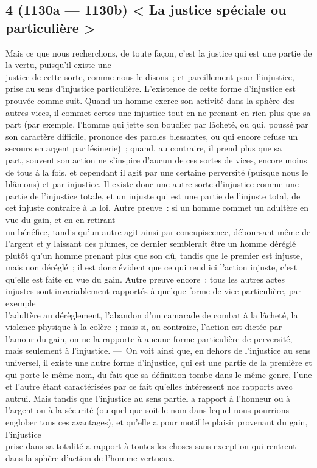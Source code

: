 \documentclass[french,twoside]{book} %
\begin{document}
\subsection[{4 (1130a — 1130b) < La justice spéciale ou particulière >}]{4 (1130a — 1130b) < La justice spéciale ou particulière >}
\noindent Mais ce que nous recherchons, de toute façon, c’est la justice qui est une partie de la vertu, puisqu’il existe une \\
justice de cette sorte, comme nous le disons ; et pareillement pour l’injustice, prise au sens d’injustice particulière. L’existence de cette forme d’injustice est prouvée comme suit. Quand un homme exerce son activité dans la sphère des autres vices, il commet certes une injustice tout en ne prenant en rien plus que sa part (par exemple, l’homme qui jette son bouclier par lâcheté, ou qui, poussé par son caractère difficile, prononce des paroles blessantes, ou qui encore refuse un secours en argent par lésinerie) ; quand, au contraire, il prend plus que sa \\
part, souvent son action ne s’inspire d’aucun de ces sortes de vices, encore moins de tous à la fois, et cependant il agit par une certaine perversité (puisque nous le blâmons) et par injustice. Il existe donc une autre sorte d’injustice comme une partie de l’injustice totale, et un injuste qui est une partie de l’injuste total, de cet injuste contraire à la loi. Autre preuve : si un homme commet un adultère en vue du gain, et en en retirant \\
un bénéfice, tandis qu’un autre agit ainsi par concupiscence, déboursant même de l’argent et y laissant des plumes, ce dernier semblerait être un homme déréglé plutôt qu’un homme prenant plus que son dû, tandis que le premier est injuste, mais non déréglé ; il est donc évident que ce qui rend ici l’action injuste, c’est qu’elle est faite en vue du gain. Autre preuve encore : tous les autres actes injustes sont invariablement rapportés à quelque forme de vice particulière, par exemple \\
l’adultère au dérèglement, l’abandon d’un camarade de combat à la lâcheté, la violence physique à la colère ; mais si, au contraire, l’action est dictée par l’amour du gain, on ne la rapporte à aucune forme particulière de perversité, mais seulement à l’injustice. — On voit ainsi que, en dehors de l’injustice au sens universel, il existe une autre forme d’injustice, qui est une partie de la première et qui porte le même nom, du fait  que sa définition tombe dans le même genre, l’une et l’autre étant caractérisées par ce fait qu’elles intéressent nos rapports avec autrui. Mais tandis que l’injustice au sens partiel a rapport à l’honneur ou à l’argent ou à la sécurité (ou quel que soit le nom dans lequel nous pourrions englober tous ces avantages), et qu’elle a pour motif le plaisir provenant du gain, l’injustice \\
prise dans sa totalité a rapport à toutes les choses sans exception qui rentrent dans la sphère d’action de l’homme vertueux.
\end{document}
